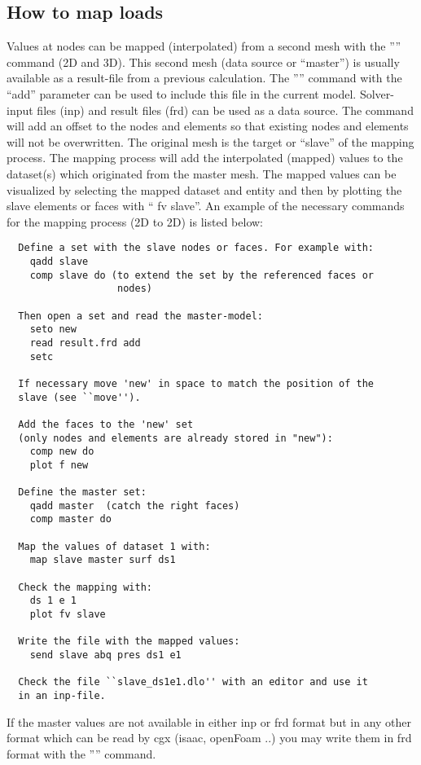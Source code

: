 \documentclass{article}
\begin{document}
\begin{appendix}
\subsection{\label{How to map loads}How to map loads}
Values at nodes can be mapped (interpolated) from a second mesh with the '''' command (2D and 3D). This second mesh (data source or ``master'') is usually available as a result-file from a previous calculation. The '''' command with the ``add'' parameter can be used to include this file in the current model. Solver-input files (inp) and result files (frd) can be used as a data source. The command will add an offset to the nodes and elements so that existing nodes and elements will not be overwritten. The original mesh is the target or ``slave'' of the mapping process. The mapping process will add the interpolated (mapped) values to the dataset(s) which originated from the master mesh. The mapped values can be visualized by selecting the mapped dataset and entity and then by plotting the slave elements or faces with `` fv slave''. An example of the necessary commands for the mapping process (2D to 2D) is listed below:
\begin{verbatim}
  Define a set with the slave nodes or faces. For example with:
    qadd slave
    comp slave do (to extend the set by the referenced faces or
                   nodes)

  Then open a set and read the master-model:
    seto new
    read result.frd add
    setc

  If necessary move 'new' in space to match the position of the
  slave (see ``move'').

  Add the faces to the 'new' set
  (only nodes and elements are already stored in "new"):
    comp new do
    plot f new

  Define the master set:
    qadd master  (catch the right faces)
    comp master do

  Map the values of dataset 1 with:
    map slave master surf ds1

  Check the mapping with:
    ds 1 e 1
    plot fv slave

  Write the file with the mapped values:
    send slave abq pres ds1 e1

  Check the file ``slave_ds1e1.dlo'' with an editor and use it
  in an inp-file.
\end{verbatim}
If the master values are not available in either inp or frd format but in any other format which can be read by cgx (isaac, openFoam ..) you may write them in frd format with the '''' command.



\end{appendix}
\end{document}
